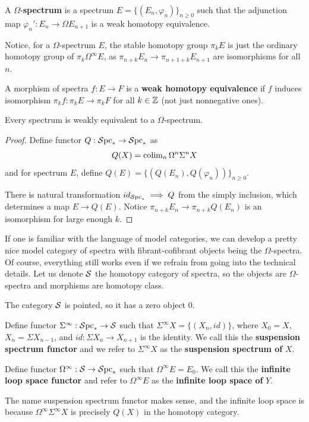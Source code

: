 \begin{definition}
    \cite{PreRudyak}
    A $\Omega$-\textbf{spectrum} is a spectrum $E=\{(E_n, \varphi_n )\}_{n \geq 0}$ such that the adjunction map $\varphi_n': E_n\to \Omega E_{n+1}$ is a weak homotopy equivalence.
\end{definition}
Notice, for a $\Omega$-spectrum $E$, the stable homotopy group $\pi_kE$ is just the ordinary homotopy group of $\pi_k \Omega^\infty E$, as $\pi_{n+k}E_n\to \pi_{n+1+k}E_{n+1}$ are isomorphisms for all $n$.
\begin{definition}
    \cite{PreSwitzer}
    A morphism of spectra $f:E\to F$ is a \textbf{weak homotopy equivalence} if $f$ induces isomorphism $\pi_kf: \pi_k E\to \pi_k F$ for all $k\in \mathbb{Z}$ (not just nonnegative ones).
\end{definition}
\begin{theorem}
    \cite{PreRudyak}
    Every spectrum is weakly equivalent to a $\Omega$-spectrum.
\end{theorem}
\begin{proof}
    Define functor $Q: \operatorname{\mathcal{S}pc}_*\to \operatorname{\mathcal{S}pc}_*$ as
    \begin{align*}
        Q(X)=\operatorname{colim}_n \Omega^n\Sigma^n X
    \end{align*}
    and for spectrum $E$, define $Q(E)=\{(Q(E_n), Q(\varphi_n))\}_{n\geq 0}$.

    There is natural transformation $id_{\operatorname{\mathcal{S}pc}_*}\implies Q$ from the simply inclusion, which determines a map $E\to Q(E)$.  Notice $\pi_{n+k}E_n\to \pi_{n+k}Q(E_n)$ is an isomorphism for large enough $k$.
\end{proof}

If one is familiar with the language of model categories, we can develop a pretty nice model category of spectra with fibrant-cofibrant objects being the $\Omega$-spectra. Of course, everything still works even if we refrain from going into the technical details. Let us denote $\operatorname{\mathcal{S}}$ the homotopy category of spectra, so the objects are $\Omega$-spectra and morphisms are homotopy class.

The category $\operatorname{\mathcal{S}}$ is pointed, so it has a zero object $0$.

\begin{definition}
    Define functor $\Sigma^\infty: \operatorname{\mathcal{S}pc}_*\to \operatorname{\mathcal{S}}$ such that $\Sigma^\infty X=\{(X_n,id)\}$, where $X_0=X$, $X_n=\Sigma X_{n-1}$, and $id: \Sigma X_n\to X_{n+1}$ is the identity. We call this the \textbf{suspension spectrum functor} and we refer to $\Sigma^\infty X$ as the \textbf{suspension spectrum of} $X$. 

    Define functor $\Omega^\infty: \operatorname{\mathcal{S}}\to \operatorname{\mathcal{S}pc}_*$ such that $\Omega^\infty E=E_0$. We call this the \textbf{infinite loop space functor} and refer to $\Omega^\infty E$ as the \textbf{infinite loop space of} $Y$.
\end{definition}
The name suspension spectrum functor makes sense, and the infinite loop space is because $\Omega^\infty \Sigma^\infty X$ is precisely $Q(X)$ in the homotopy category.



